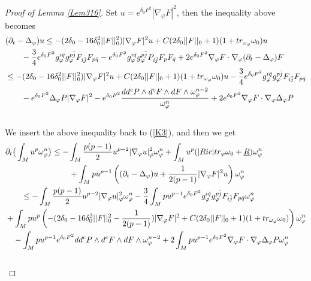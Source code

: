 \documentclass[11pt]{amsart}
\numberwithin{equation}{section}
\begin{document}
\begin{proof}[Proof of Lemma \ref{Lem316}]
\noindent
Set $u=e^{\delta_0 F^2}|\nabla_\varphi F|^2$, then the inequality above becomes  
\begin{align}
	& (\partial_t-\Delta_{\varphi})u\le  -(2\delta_0-16\delta_0^2 ||F||_0^2)|\nabla_\varphi F|^2 u + C(2\delta_0 ||F||_0 +1)(1+tr_{\omega_{\varphi}}\omega_0)u  \notag\\
	&\quad\quad -\frac{3}{4} e^{\delta_0 F^2} g_{\varphi}^{i\bar{q}}g_{\varphi}^{p\bar{j}}F_{i\bar{j}}F_{p\bar{q}} - e^{\delta_0 F^2} g_{\varphi}^{i\bar{q}}g_{\varphi}^{p\bar{j}}P_{i\bar{j}} F_pF_{\bar{q}} + 2e^{\delta_0 F^2} \nabla_{\varphi}F\cdot \nabla_{\varphi}(\partial_t-\Delta_{\varphi})F \notag\\
	& \le  - (2\delta_0-16\delta_0^2 ||F||_0^2)|\nabla_\varphi F|^2 u + C(2\delta_0 ||F||_0 +1)(1+tr_{\omega_{\varphi}}\omega_0)u -\frac{3}{4} e^{\delta_0 F^2} g_{\varphi}^{i\bar{q}}g_{\varphi}^{p\bar{j}}F_{i\bar{j}}F_{p\bar{q}} \notag\\
	&\quad\quad - e^{\delta_0 F^2}\Delta_{\varphi}P|\nabla_{\varphi}F|^2 - e^{\delta_0 F^2}\frac{dd^c P\wedge d^c F\wedge d F\wedge \omega_{\varphi}^{n-2}}{\omega_{\varphi}^n} + 2e^{\delta_0 F^2} \nabla_{\varphi}F\cdot \nabla_{\varphi}\Delta_\varphi P
\end{align}\\
We insert the above inequality back to (\ref{K3}), and then we get 
\begin{align}
	&\partial_t\big( \int_M u^p\omega_\varphi^n\big)\le  - \int_M \frac{p(p-1)}{2} u^{p-2} |\nabla_\varphi u|^2_\varphi\omega_\varphi^n +\int_M u^p(|Ric|tr_\varphi\omega_0+\underline R)\omega_\varphi^n \notag\\
	&\qquad\qquad\qquad\qquad +\int_M pu^{p-1}\left( (\partial_t-\Delta_\varphi)u+  \frac{1}{2(p-1)}|\nabla_\varphi F|^2 u  \right) \omega_\varphi^n \notag\\
	 &\qquad \le  - \int_M \frac{p(p-1)}{2} u^{p-2} |\nabla_\varphi u|^2_\varphi\omega_\varphi^n - \frac{3}{4}\int_M pu^{p-1}e^{\delta_0 F^2} g_{\varphi}^{i\bar{q}}g_{\varphi}^{p\bar{j}}F_{i\bar{j}}F_{p\bar{q}}\omega_\varphi^n \notag\\
	 & +\int_M pu^{p}\left( -(2\delta_0-16\delta_0^2 ||F||_0^2-\frac{1}{2(p-1)})|\nabla_\varphi F|^2 +C(2\delta_0 ||F||_0 +1)(1+tr_{\omega_{\varphi}}\omega_0)\right)\omega_\varphi^n \notag\\
	 & \quad -\int_M pu^{p-1}e^{\delta_0 F^2}dd^c P\wedge d^c F\wedge d F\wedge \omega_{\varphi}^{n-2} + 2\int_M pu^{p-1}e^{\delta_0 F^2} \nabla_{\varphi}F\cdot \nabla_{\varphi}\Delta_\varphi P \omega_\varphi^n 
\end{align}\\

\end{proof}
\end{document}
